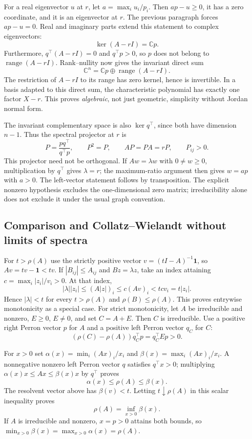 \documentclass[11pt,a4paper]{article}
\newcommand{\C}{\mathbb C}
\begin{document}
For a real eigenvector $u$ at $r$, let $a=\max_i u_i/p_i$. Then
$ap-u\ge0$, it has a zero coordinate, and it is an eigenvector at $r$.
The previous paragraph forces $ap-u=0$. Real and imaginary parts extend
this statement to complex eigenvectors:
\[
 \ker(A-rI)=\C p.
\]
Furthermore, $q^\top(A-rI)=0$ and $q^\top p>0$, so $p$ does not belong
to $\operatorname{range}(A-rI)$. Rank--nullity now gives the invariant
direct sum
\[
 \C^n=\C p\oplus\operatorname{range}(A-rI).
\]
The restriction of $A-rI$ to its range has zero kernel, hence is invertible.
In a basis adapted to this direct sum, the characteristic polynomial has
exactly one factor $X-r$. This proves \emph{algebraic}, not just geometric,
simplicity without Jordan normal form.

The invariant complementary space is also $\ker q^\top$, since both have
dimension $n-1$. Thus the spectral projector at $r$ is
\[
 P=\frac{pq^\top}{q^\top p},\qquad P^2=P,\qquad AP=PA=rP,
 \qquad P_{ij}>0.
\]
This projector need not be orthogonal. If $Aw=\lambda w$ with
$0\ne w\ge0$, multiplication by $q^\top$ gives $\lambda=r$; the
maximum-ratio argument then gives $w=ap$ with $a>0$. The left-vector
statement follows by transposition. The explicit nonzero hypothesis
excludes the one-dimensional zero matrix; irreducibility alone does not
exclude it under the usual graph convention.

\subsection{Comparison and Collatz--Wielandt without limits of spectra}

For $t>\rho(A)$ use the strictly positive vector
$v=(tI-A)^{-1}\boldsymbol1$, so $Av=tv-\boldsymbol1<tv$.
If $|B_{ij}|\le A_{ij}$ and $Bz=\lambda z$, take an index attaining
$c=\max_i|z_i|/v_i>0$. At that index,
\[
 |\lambda||z_i|\le(A|z|)_i\le c(Av)_i<t c v_i=t|z_i|.
\]
Hence $|\lambda|<t$ for every $t>\rho(A)$ and
$\rho(B)\le\rho(A)$. This proves entrywise monotonicity as a special case.
For strict monotonicity, let $A$ be irreducible and nonzero, $E\ge0$,
$E\ne0$, and set $C=A+E$. Then $C$ is irreducible. Use a positive right
Perron vector $p$ for $A$ and a positive left Perron vector $q_C$ for $C$:
\[
 (\rho(C)-\rho(A))q_C^\top p=q_C^\top E p>0.
\]

For $x>0$ set
$\alpha(x)=\min_i(Ax)_i/x_i$ and
$\beta(x)=\max_i(Ax)_i/x_i$. A nonnegative nonzero left Perron vector
$q$ satisfies $q^\top x>0$; multiplying
$\alpha(x)x\le Ax\le\beta(x)x$ by $q^\top$ proves
\[
 \alpha(x)\le\rho(A)\le\beta(x).
\]
The resolvent vector above has $\beta(v)<t$. Letting $t\downarrow\rho(A)$
in this scalar inequality proves
\[
 \rho(A)=\inf_{x>0}\beta(x).
\]
If $A$ is irreducible and nonzero, $x=p>0$ attains both bounds, so
$\min_{x>0}\beta(x)=\max_{x>0}\alpha(x)=\rho(A)$.
\end{document}
